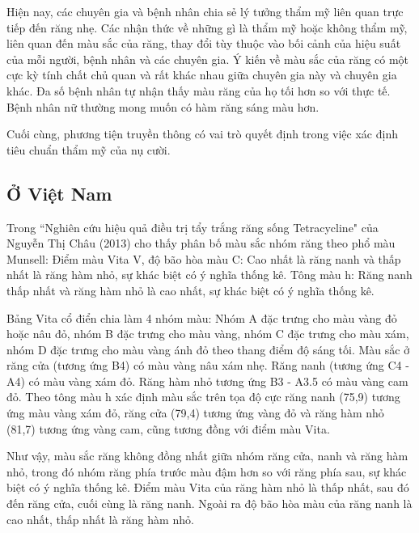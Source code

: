 \quad Hiện nay, các chuyên gia và bệnh nhân chia sẻ lý tưởng thẩm mỹ liên quan trực tiếp đến răng nhẹ. Các nhận thức về những gì là thẩm mỹ hoặc không thẩm mỹ, liên quan đến màu sắc của răng, thay đổi tùy thuộc vào bối cảnh của hiệu suất của mỗi người, bệnh nhân và các chuyên gia. Ý kiến về màu sắc của răng có một cực kỳ tính chất chủ quan và rất khác nhau giữa chuyên gia này và chuyên gia khác. Đa số bệnh nhân tự nhận thấy màu răng của họ tối hơn so với thực tế. Bệnh nhân nữ thường mong muốn có hàm răng sáng màu hơn.\cite{Renata2021}\par
\quad Cuối cùng, phương tiện truyền thông có vai trò quyết định trong việc xác định tiêu chuẩn thẩm mỹ của nụ cười.\par
\subsection{Ở Việt Nam}
\qquad Trong “Nghiên cứu hiệu quả điều trị tẩy trắng răng sống Tetracycline" của Nguyễn Thị Châu (2013) cho thấy phân bố màu sắc nhóm răng theo phổ màu Munsell: Điểm màu Vita V, độ bão hòa màu C: Cao nhất là răng nanh và thấp nhất là răng hàm nhỏ, sự khác biệt có ý nghĩa thống kê. Tông màu h: Răng nanh thấp nhất và răng hàm nhỏ là cao nhất, sự khác biệt có ý nghĩa thống kê. \par
\quad Bảng Vita cổ điển chia làm 4 nhóm màu: Nhóm A đặc trưng cho màu vàng đỏ hoặc nâu đỏ, nhóm B đặc trưng cho màu vàng, nhóm C đặc trưng cho màu xám, nhóm D đặc trưng cho màu vàng ánh đỏ theo thang điểm độ sáng tối. Màu sắc ở răng cửa (tương ứng B4) có màu vàng nâu xám nhẹ. Răng nanh (tương ứng C4 - A4) có màu vàng xám đỏ. Răng hàm nhỏ tương ứng B3 - A3.5 có màu vàng cam đỏ. Theo tông màu h xác định màu sắc trên tọa độ cực răng nanh (75,9) tương ứng màu vàng xám đỏ, răng cửa (79,4) tương ứng vàng đỏ và răng hàm nhỏ (81,7) tương ứng vàng cam, cũng tương đồng với điểm màu Vita\cite{NguyenThiChau}. \par
\quad Như vậy, màu sắc răng không đồng nhất giữa nhóm răng cửa, nanh và răng hàm nhỏ, trong đó nhóm răng phía trước màu đậm hơn so với răng phía sau, sự khác biệt có ý nghĩa thống kê. Điểm màu Vita của răng hàm nhỏ là thấp nhất, sau đó đến răng cửa, cuối cùng là răng nanh. Ngoài ra độ bão hòa màu của răng nanh là cao nhất, thấp nhất là răng hàm nhỏ.\cite{NguyenThiChau}\par



